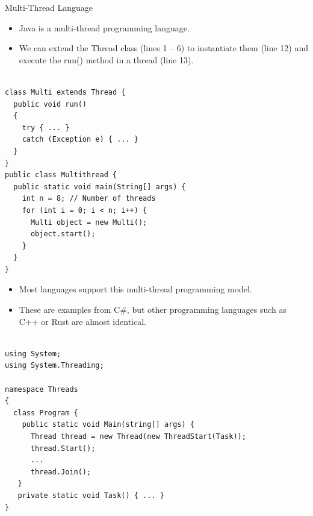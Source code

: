\begin{frame}[fragile]{Multi-Thread Language}

\begin{itemize}
	\item Java is a multi-thread programming language.
	\item We can extend the Thread class (lines 1 -- 6) to instantiate them (line 12) and execute the run() method in a thread (line 13). 
\end{itemize}

\begin{Code}{}%
\begin{lstlisting}[firstnumber=1, label=glabels, xleftmargin=0pt, basicstyle=\tiny]% 

class Multi extends Thread {
  public void run()
  {
    try { ... }
    catch (Exception e) { ... }
  }
}
public class Multithread {
  public static void main(String[] args) {
    int n = 8; // Number of threads
    for (int i = 0; i < n; i++) {
      Multi object = new Multi();
      object.start();
    }
  }
}
\end{lstlisting}%
\end{Code}%
\end{frame}

\begin{frame}[fragile]{}

\begin{itemize}
	\item Most languages support this multi-thread programming model. 
	\item These are examples from C\#, but other programming languages such as C++ or Rust are almost identical. 
\end{itemize}

\begin{Code}{}%
\begin{lstlisting}[firstnumber=1, label=glabels, xleftmargin=0pt, basicstyle=\scriptsize]% 

using System;
using System.Threading;
 
namespace Threads
{
  class Program {
    public static void Main(string[] args) {
      Thread thread = new Thread(new ThreadStart(Task));
      thread.Start();
      ...
      thread.Join();
   }
   private static void Task() { ... }
}   
\end{lstlisting}%
\end{Code}%
\end{frame}

